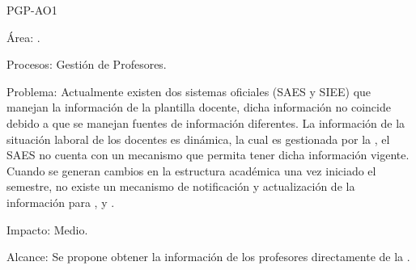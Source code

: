 \begin{AreaOportunidad}{PGP-AO1}
	\item[Área:] .
	\item[Procesos:] Gestión de Profesores.
	\item[Problema:] Actualmente existen dos sistemas oficiales (SAES y SIEE) que manejan la información de la plantilla docente, dicha información no coincide debido a que se manejan fuentes de información diferentes.
	La información de la situación laboral de los docentes es dinámica, la cual es gestionada por la , el SAES no cuenta con un mecanismo que permita tener dicha información vigente.\\
	Cuando se generan cambios en la estructura académica una vez iniciado el semestre, no existe un mecanismo de notificación y actualización de la información para ,  y .
	
	\item[Impacto:] Medio.
	\item[Alcance:] Se propone obtener la información de los profesores directamente de la . %
	
\end{AreaOportunidad}



